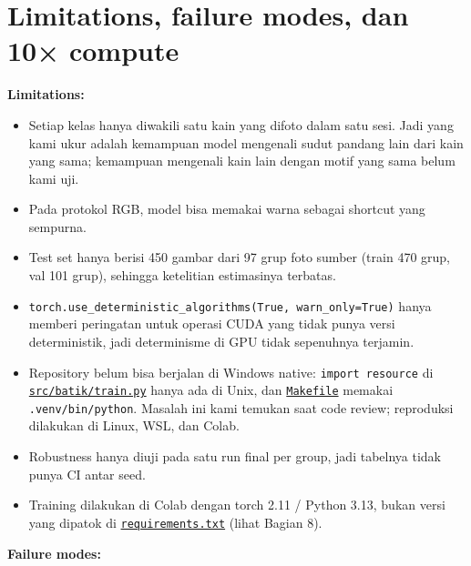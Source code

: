 \documentclass[10pt,a4paper]{article}
\providecommand{\tightlist}{\setlength{\itemsep}{2pt}\setlength{\parskip}{0pt}}
\begin{document}
\section{Limitations, failure modes, dan 10× compute}\label{limitations-failure-modes-dan-10-compute}

\textbf{Limitations:}

\begin{itemize}
\tightlist
\item
  Setiap kelas hanya diwakili satu kain yang difoto dalam satu sesi. Jadi yang kami ukur adalah kemampuan model mengenali sudut pandang lain dari kain yang sama; kemampuan mengenali kain lain dengan motif yang sama belum kami uji.
\item
  Pada protokol RGB, model bisa memakai warna sebagai shortcut yang sempurna.
\item
  Test set hanya berisi 450 gambar dari 97 grup foto sumber (train 470 grup, val 101 grup), sehingga ketelitian estimasinya terbatas.
\item
  \texttt{torch.use\_deterministic\_algorithms(True,\ warn\_only=True)} hanya memberi peringatan untuk operasi CUDA yang tidak punya versi deterministik, jadi determinisme di GPU tidak sepenuhnya terjamin.
\item
  Repository belum bisa berjalan di Windows native: \texttt{import\ resource} di \href{https://github.com/Universitas-Cakrawala/semarang-batik-fine-grained-transfer-learning/blob/main/src/batik/train.py}{\texttt{src/\allowbreak{}batik/\allowbreak{}train.py}} hanya ada di Unix, dan \href{https://github.com/Universitas-Cakrawala/semarang-batik-fine-grained-transfer-learning/blob/main/Makefile}{\texttt{Makefile}} memakai \texttt{.venv/\allowbreak{}bin/\allowbreak{}python}. Masalah ini kami temukan saat code review; reproduksi dilakukan di Linux, WSL, dan Colab.
\item
  Robustness hanya diuji pada satu run final per group, jadi tabelnya tidak punya CI antar seed.
\item
  Training dilakukan di Colab dengan torch 2.11 / Python 3.13, bukan versi yang dipatok di \href{https://github.com/Universitas-Cakrawala/semarang-batik-fine-grained-transfer-learning/blob/main/requirements.txt}{\texttt{requirements.txt}} (lihat Bagian 8).
\end{itemize}

\textbf{Failure modes:}
\end{document}
